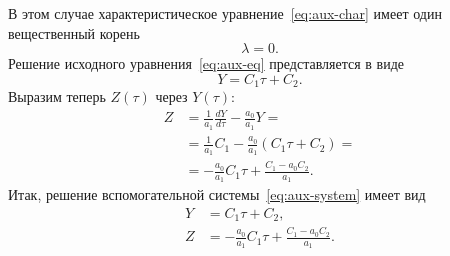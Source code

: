 \documentclass[a4paper,14pt]{article}
\theoremstyle{definition}
\begin{document}
В этом случае характеристическое уравнение~\eqref{eq:aux-char}
имеет один вещественный корень
\begin{equation*}
  \lambda = 0.
\end{equation*}
Решение исходного уравнения~\eqref{eq:aux-eq} представляется в
виде
\begin{equation*}
  Y = C_1 \tau + C_2.
\end{equation*}
Выразим теперь $Z(\tau)$ через $Y(\tau)$:
\begin{equation*}
  \begin{aligned}
    Z
    &=
      \frac{1}{a_1} \frac{d Y}{d \tau} - \frac{a_0}{a_1} Y = \\
    &=
      \frac{1}{a_1} C_1
      - \frac{a_0}{a_1} \left(
      C_1 \tau + C_2
      \right) = \\
    &=
      - \frac{a_0}{a_1} C_1 \tau
      + \frac{C_1 - a_0 C_2}{a_1}.
  \end{aligned}
\end{equation*}
Итак, решение вспомогательной системы~\eqref{eq:aux-system}
имеет вид
\begin{equation}
  \begin{aligned}
    Y &= C_1 \tau + C_2, \\
    Z &=
        - \frac{a_0}{a_1} C_1 \tau
        + \frac{C_1 - a_0 C_2}{a_1}.
  \end{aligned}
\end{equation}
\end{document}
